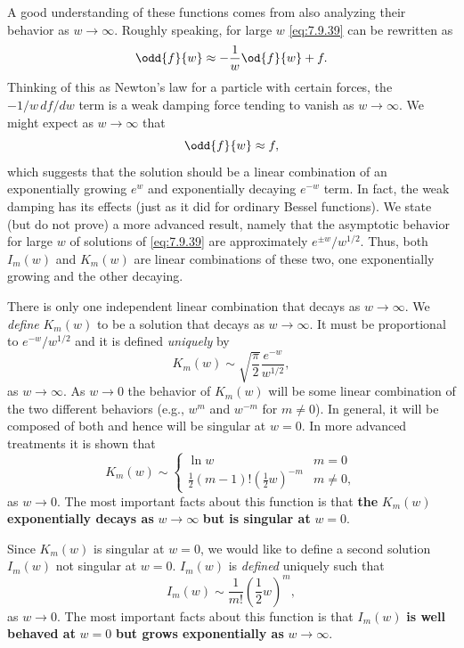 A good understanding of these functions comes from also analyzing their behavior as $w \to \infty$.  Roughly speaking, for large $w$ \eqref{eq:7.9.39} can be rewritten as
\begin{equation}
\odd{f}{w} \approx -\frac{1}{w}\od{f}{w} + f.
\label{eq:7.9.40}
\end{equation}
Thinking of this as Newton's law for a particle with certain forces, the $-1/w\,df/dw$ term is a weak damping force tending to vanish as $w \to \infty$.  We might expect as $w \to \infty$ that
\[
\odd{f}{w} \approx f,
\]
which suggests that the solution should be a linear combination of an exponentially growing $e^w$ and exponentially decaying $e^{-w}$ term.  In fact, the weak damping has its effects (just as it did for ordinary Bessel functions).  We state (but do not prove) a more advanced result, namely that the asymptotic behavior for large $w$ of solutions of \eqref{eq:7.9.39} are approximately $e^{\pm w}/w^{1/2}$.  Thus, both $I_m(w)$ and $K_m(w)$ are linear combinations of these two, one exponentially growing and the other decaying.

There is only one independent linear combination that decays as $w \to \infty$.  We \emph{define} $K_m(w)$ to be a solution that decays as $w \to \infty$.  It must be proportional to $e^{-w}/w^{1/2}$ and it is defined \emph{uniquely} by
\begin{equation}
\boxed{K_m(w) \sim \sqrt{\frac{\pi}{2}}\frac{e^{-w}}{w^{1/2}},}
\label{eq:7.9.41}
\end{equation}
as $w \to \infty$.  As $w \to 0$ the behavior of $K_m(w)$ will be some linear combination of the two different behaviors (e.g., $w^m$ and $w^{-m}$ for $m \neq 0$).  In general, it will be composed of both and hence will be singular at $w = 0$.  In more advanced treatments it is shown that
\begin{equation}
\boxed{K_m(w) \sim \begin{cases} \ln w & m = 0 \\ \frac{1}{2}(m-1)!(\frac{1}{2}w)^{-m} & m \neq 0, \end{cases}}
\label{eq:7.9.42}
\end{equation}
as $w \to 0$.  The most important facts about this function is that \textbf{the} $K_m(w)$ \textbf{exponentially decays as} $w \to \infty$ \textbf{but is singular at} $w = 0$.

Since $K_m(w)$ is singular at $w = 0$, we would like to define a second solution $I_m(w)$ not singular at $w = 0$.  $I_m(w)$ is \emph{defined} uniquely such that
\begin{equation}
\boxed{I_m(w) \sim \frac{1}{m!}\left(\frac{1}{2}w\right)^m,}
\label{eq:7.9.43}
\end{equation}
as $w \to 0$.  The most important facts about this function is that $I_m(w)$ \textbf{is well behaved at} $w = 0$ \textbf{but grows exponentially as} $w \to \infty$.

